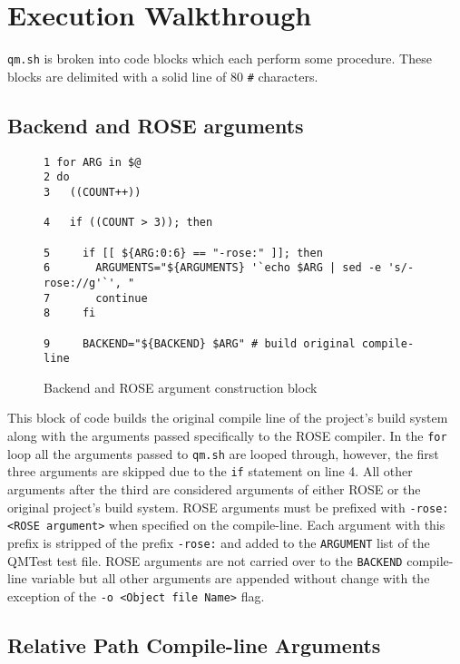 \section{Execution Walkthrough}
{\tt qm.sh} is broken into code blocks which each perform some procedure. These
blocks are delimited with a solid line of 80 {\tt \#} characters.

\subsection{Backend and ROSE arguments}

\begin{figure}[!ht]
{\scriptsize
\begin{verbatim}
1 for ARG in $@
2 do
3   ((COUNT++))
                                                                                
4   if ((COUNT > 3)); then
                                                                                
5     if [[ ${ARG:0:6} == "-rose:" ]]; then
6       ARGUMENTS="${ARGUMENTS} '`echo $ARG | sed -e 's/-rose://g'`', "
7       continue
8     fi
                                                                                
9     BACKEND="${BACKEND} $ARG" # build original compile-line
\end{verbatim}
}
\caption{Backend and ROSE argument construction block}
\end{figure}

This block of code builds the original compile line of the project's build
system along with the arguments passed specifically to the ROSE compiler. In
the {\tt for} loop all the arguments passed to {\tt qm.sh} are looped through,
however, the first three arguments are skipped due to the {\tt if} statement on
line 4. All other arguments after the third are considered arguments of either
ROSE or the original project's build system. ROSE arguments must be prefixed
with {\tt -rose:<ROSE argument>} when specified on the compile-line. Each
argument with this prefix is stripped of the prefix {\tt -rose:} and added to
the {\tt ARGUMENT} list of the QMTest test file. ROSE arguments are not
carried over to the {\tt BACKEND} compile-line variable but all other arguments
are appended without change with the exception of the 
{\tt -o <Object file Name>} flag.

\subsection{Relative Path Compile-line Arguments}

